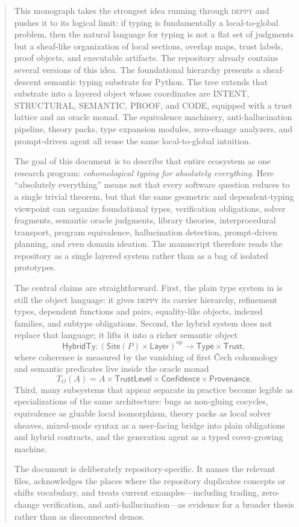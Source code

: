 \documentclass[11pt]{report}
\newcommand{\DepPy}{\textsc{deppy}}
\newcommand{\Site}{\ensuremath{\mathsf{Site}}}
\newcommand{\Layer}{\ensuremath{\mathsf{Layer}}}
\newcommand{\Type}{\ensuremath{\mathsf{Type}}}
\newcommand{\Trust}{\ensuremath{\mathsf{Trust}}}
\newcommand{\HybridTy}{\ensuremath{\mathsf{HybridTy}}}
\newcommand{\op}{\mathrm{op}}
\newcommand{\TO}{\ensuremath{T_O}}
\DeclareRobustCommand{\repo}[1]{\path{#1}}
\theoremstyle{definition}
\theoremstyle{plain}
\begin{document}
\begin{abstract}
This monograph takes the strongest idea running through \DepPy{} and pushes it to its
logical limit: if typing is fundamentally a local-to-global problem, then the natural
language for typing is not a flat set of judgments but a sheaf-like organization of local
sections, overlap maps, trust labels, proof objects, and executable artifacts. The
repository already contains several versions of this idea. The foundational
\repo{src/deppy/types/} hierarchy presents a sheaf-descent semantic typing substrate for
Python. The \repo{src/deppy/hybrid/} tree extends that substrate into a layered object
whose coordinates are INTENT, STRUCTURAL, SEMANTIC, PROOF, and CODE, equipped with a
trust lattice and an oracle monad. The equivalence machinery, anti-hallucination
pipeline, theory packs, type expansion modules, zero-change analyzers, and prompt-driven
agent all reuse the same local-to-global intuition.

The goal of this document is to describe that entire ecosystem as one research program:
\emph{cohomological typing for absolutely everything}. Here ``absolutely everything''
means not that every software question reduces to a single trivial theorem, but that the
same geometric and dependent-typing viewpoint can organize foundational types,
verification obligations, solver fragments, semantic oracle judgments, library theories,
interprocedural transport, program equivalence, hallucination detection, prompt-driven
planning, and even domain ideation. The manuscript therefore reads the repository as a
single layered system rather than as a bag of isolated prototypes.

The central claims are straightforward. First, the plain type system in
\repo{src/deppy/types/} is still the object language: it gives \DepPy{} its carrier
hierarchy, refinement types, dependent functions and pairs, equality-like objects,
indexed families, and subtype obligations. Second, the hybrid system does not replace
that language; it lifts it into a richer semantic object
\[
  \HybridTy : (\Site(P) \times \Layer)^{\op} \to \Type \times \Trust,
\]
where coherence is measured by the vanishing of first \v{C}ech cohomology and semantic
predicates live inside the oracle monad
\[
  \TO(A) = A \times \mathsf{TrustLevel} \times \mathsf{Confidence} \times \mathsf{Provenance}.
\]
Third, many subsystems that appear separate in practice become legible as specializations
of the same architecture: bugs as non-gluing cocycles, equivalence as gluable local
isomorphism, theory packs as local solver sheaves, mixed-mode syntax as a user-facing
bridge into plain obligations and hybrid contracts, and the generation agent as a typed
cover-growing machine.

The document is deliberately repository-specific. It names the relevant files,
acknowledges the places where the repository duplicates concepts or shifts vocabulary,
and treats current examples---including trading, zero-change verification, and
anti-hallucination---as evidence for a broader thesis rather than as disconnected demos.
\end{abstract}
\end{document}
